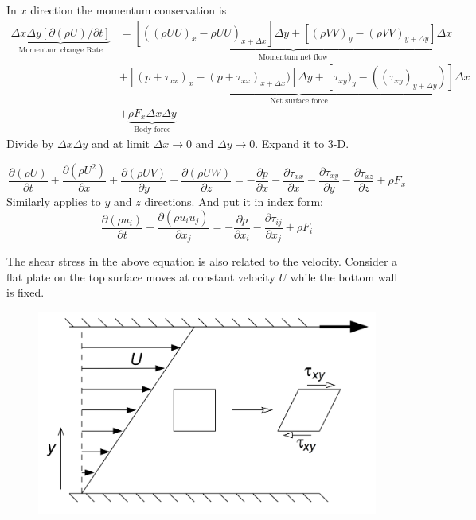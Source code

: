 \documentclass{article}
\begin{document}
In $x$ direction the momentum conservation is 
\begin{align*}
\underbrace{\Delta x \Delta y \left[\partial \left( \rho U \right) / \partial t \right]}_{\text{Momentum change Rate}} & = \underbrace{\left[((\rho U U)_x -\rho U U)_{x + \Delta x} \right]\Delta y + \left[(\rho V V)_y -(\rho V V)_{y + \Delta y} \right]\Delta x}_{\text{Momentum net flow}} \\ 
&+ \underbrace{\left[ (p + \tau_{xx})_x - (p + \tau_{x x})_{x + \Delta x}) \right]\Delta y + \left[\tau_{xy})_y -( (\tau_{xy})_{y + \Delta y}) \right] \Delta x}_{\text{Net surface force}}  \\
& + \underbrace{\rho F_x \Delta x \Delta y}_{\text{Body force}}
\end{align*}
Divide by $\Delta x \Delta y$ and at limit $\Delta x \rightarrow 0 \text{ and } \Delta y \rightarrow 0$. Expand it to 3-D. 

\begin{equation}
\frac{\partial(\rho U)}{\partial t} + \frac{\partial (\rho U^2)}{\partial x} + \frac{\partial (\rho UV)}{\partial y} +\frac{\partial (\rho UW)}{\partial z} = -\frac{\partial p}{\partial x} -\frac{\partial \tau_{xx}}{\partial x} - \frac{\partial \tau_{xy}}{\partial y} - \frac{\partial \tau_{xz}}{\partial z} + \rho F_x
\label{eq:momentum x}
\end{equation}
Similarly applies to $y$ and $z$ directions. And put it in index form: 
\begin{equation}
\frac{\partial(\rho u_i)}{\partial t} + \frac{\partial (\rho u_i u_j)}{\partial x_j} = -\frac{\partial p}{\partial x_i} - \frac{\partial \tau_{ij}}{\partial x_j} + \rho F_i
\end{equation}

The shear stress in the above equation is also related to the velocity. Consider a flat plate on the top surface moves at constant velocity $U$ while the bottom wall is fixed.
\begin{figure}[h!]
\centering
\includegraphics[scale = 0.1]{viscosity.PNG}
\end{figure}
\end{document}
